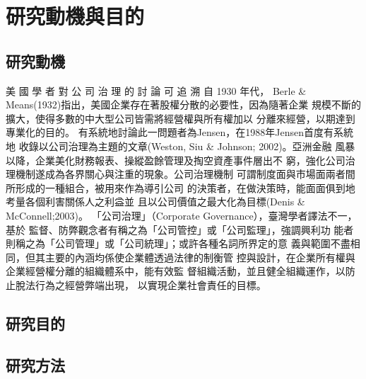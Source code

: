 \documentclass[
    writingLanguage=chinese,
    addPageTitle=yes,
    AddDeclaration=yes,
    addMUSTlog=no,
    refUnindent=yes,
    printing=no,
]{.def/must}
\begin{document}
\section{研究動機與目的}
\citep{luey2013, turabian2015, WangZhenWu2004, WenZaoWai2009, QiuZiHeng2017, HeDingZhao2019, WuPeiHua2020, QiuJiongYou2014, QiuJiongYou2016, QiuJiongYou2019, LinDongTai2008, LinJing2018, LinWenYao2018, LinXHui2014, HongWenQi2019, HongZhenZhou2018, ChenYaNing9999, ChenXiaMin2019, ZhangYan2016, GuoJiaTu2019, WenDaMao2015, JianYiLing2019, bourdieu1990, cohen2007, harvey2007, manguel2009, šteger2010, Villazón2011, bordwell2013, cole2013, deliot2014, foster2017, paige2017, johnson2018, wipawin2018, poff2019, giles2019, TaiwanNews2019, abdoh2019, macdonald2020, Milliot2020, OrganisationforEconomicCo2020, rothfeld2020, crotty2020, melero2021}

\subsection{研究動機}
美 國 學 者 對 公 司 治 理 的 討 論 可 追 溯 自 1930 年代， Berle \&
Means(1932)指出，美國企業存在著股權分散的必要性，因為隨著企業
規模不斷的擴大，使得多數的中大型公司皆需將經營權與所有權加以
分離來經營，以期達到專業化的目的。
有系統地討論此一問題者為Jensen，在1988年Jensen首度有系統地
收錄以公司治理為主題的文章(Weston, Siu \& Johnson; 2002)。亞洲金融
風暴以降，企業美化財務報表、操縱盈餘管理及掏空資產事件層出不
窮，強化公司治理機制遂成為各界關心與注重的現象。公司治理機制
可謂制度面與市場面兩者間所形成的一種組合，被用來作為導引公司
的決策者，在做決策時，能面面俱到地考量各個利害關係人之利益並
且以公司價值之最大化為目標(Denis \& McConnell;2003)。
「公司治理」（Corporate Governance），臺灣學者譯法不一，基於
監督、防弊觀念者有稱之為「公司管控」或「公司監理」，強調興利功
能者則稱之為「公司管理」或「公司統理」；或許各種名詞所界定的意
義與範圍不盡相同，但其主要的內涵均係使企業體透過法律的制衡管
控與設計，在企業所有權與企業經營權分離的組織體系中，能有效監
督組織活動，並且健全組織運作，以防止脫法行為之經營弊端出現，
以實現企業社會責任的目標。
\txtHere[1]

\subsection{研究目的}

\txtHere[2]

\subsection{研究方法}
\end{document}
